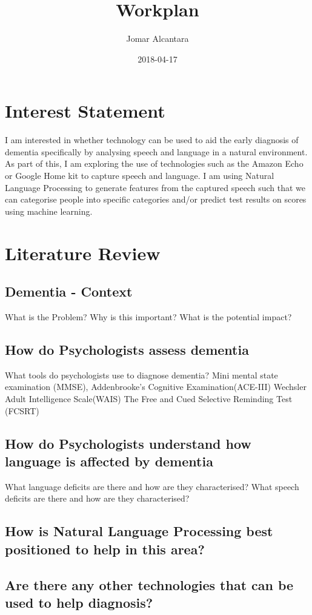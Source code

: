 \documentclass{article}
\title{Workplan}
\date{2018-04-17}
\author{Jomar Alcantara}
\begin{document}
	\maketitle
	\section{Interest Statement}
	I am interested in whether technology can be used to aid the early diagnosis of dementia specifically by analysing speech and language in a natural environment. As part of this, I am exploring the use of technologies such as the Amazon Echo or Google Home kit to capture speech and language. I am using Natural Language Processing to generate features from the captured speech such that we can categorise people into specific categories and/or predict test results on scores using machine learning.
	\section{Literature Review}
	\subsection{Dementia - Context}
	What is the Problem? 
	Why is this important?
	What is the potential impact?
	\subsection{How do Psychologists assess dementia}
	What tools do psychologists use to diagnose dementia? 
	Mini mental state examination (MMSE), 
	Addenbrooke's Cognitive Examination(ACE-III)
	Wechsler Adult Intelligence Scale(WAIS)
	The Free and Cued Selective Reminding Test (FCSRT)
	\subsection{How do Psychologists understand how language is affected by dementia}
	What language deficits are there and how are they characterised?
	What speech deficits are there and how are they characterised?
	\subsection{How is Natural Language Processing best positioned to help in this area?}
	\subsection{Are there any other technologies that can be used to help diagnosis?}
	
\end{document}
